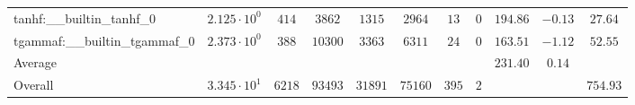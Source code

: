 \begin{tabular}{|l|c|c|c|c|c|c|c|c|c|c|}
tanhf:\_\_builtin\_tanhf\_0               & $ 2.125 \cdot 10^{0}  $ & $ 414    $ & $ 3862  $ & $ 1315  $ & $ 2964  $ & $ 13  $ & $ 0 $ & $ 194.86      $ & $ -0.13   $ & $ 27.64   $ \\
tgammaf:\_\_builtin\_tgammaf\_0           & $ 2.373 \cdot 10^{0}  $ & $ 388    $ & $ 10300 $ & $ 3363  $ & $ 6311  $ & $ 24  $ & $ 0 $ & $ 163.51      $ & $ -1.12   $ & $ 52.55   $ \\
\hline
Average                                   & $                     $ & $        $ & $       $ & $       $ & $       $ & $     $ & $   $ & $ 231.40      $ & $ 0.14    $ & $         $ \\
\hline
Overall                                   & $ 3.345 \cdot 10^{1}  $ & $ 6218   $ & $ 93493 $ & $ 31891 $ & $ 75160 $ & $ 395 $ & $ 2 $ & $             $ & $         $ & $ 754.93  $ \\
\hline
\end{tabular}
